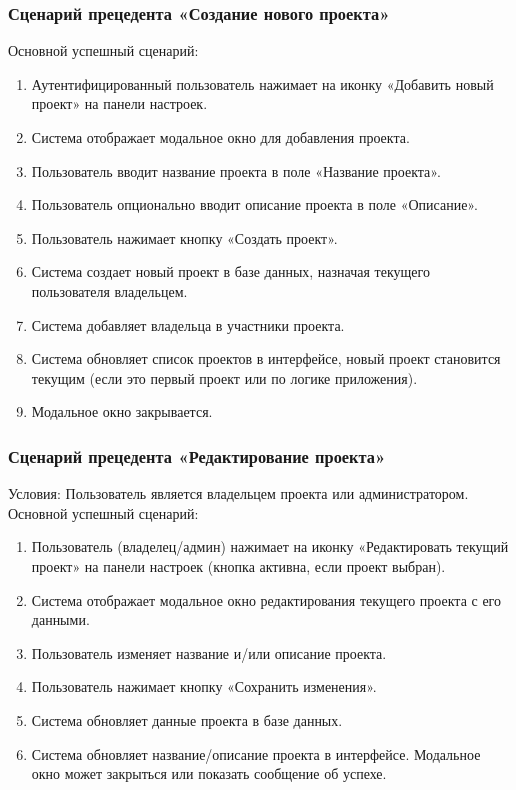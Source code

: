 \subsubsection{Сценарий прецедента «Создание нового проекта»}
Основной успешный сценарий:
\begin{enumerate}
	\item Аутентифицированный пользователь нажимает на иконку «Добавить новый проект» на панели настроек.
	\item Система отображает модальное окно для добавления проекта.
	\item Пользователь вводит название проекта в поле «Название проекта».
	\item Пользователь опционально вводит описание проекта в поле «Описание».
	\item Пользователь нажимает кнопку «Создать проект».
	\item Система создает новый проект в базе данных, назначая текущего пользователя владельцем.
	\item Система добавляет владельца в участники проекта.
	\item Система обновляет список проектов в интерфейсе, новый проект становится текущим (если это первый проект или по логике приложения).
	\item Модальное окно закрывается.
\end{enumerate}

\subsubsection{Сценарий прецедента «Редактирование проекта»}
Условия: Пользователь является владельцем проекта или администратором.
Основной успешный сценарий:
\begin{enumerate}
	\item Пользователь (владелец/админ) нажимает на иконку «Редактировать текущий проект» на панели настроек (кнопка активна, если проект выбран).
	\item Система отображает модальное окно редактирования текущего проекта с его данными.
	\item Пользователь изменяет название и/или описание проекта.
	\item Пользователь нажимает кнопку «Сохранить изменения».
	\item Система обновляет данные проекта в базе данных.
	\item Система обновляет название/описание проекта в интерфейсе. Модальное окно может закрыться или показать сообщение об успехе.
\end{enumerate}

